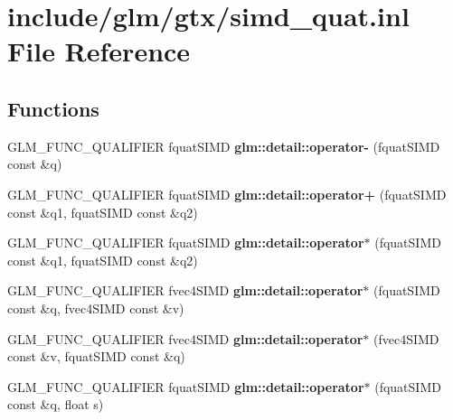 \hypertarget{simd__quat_8inl}{}\section{include/glm/gtx/simd\+\_\+quat.inl File Reference}
\label{simd__quat_8inl}
\subsection*{Functions}
\begin{DoxyCompactItemize}
\item 
\mbox{\label{simd__quat_8inl_a07dbb5e436fcb64a3c165a15c920a484}} 
G\+L\+M\+\_\+\+F\+U\+N\+C\+\_\+\+Q\+U\+A\+L\+I\+F\+I\+ER fquat\+S\+I\+MD {\bfseries glm\+::detail\+::operator-\/} (fquat\+S\+I\+MD const \&q)
\item 
\mbox{\label{simd__quat_8inl_a0010f5683721f2724e0e00709fc51405}} 
G\+L\+M\+\_\+\+F\+U\+N\+C\+\_\+\+Q\+U\+A\+L\+I\+F\+I\+ER fquat\+S\+I\+MD {\bfseries glm\+::detail\+::operator+} (fquat\+S\+I\+MD const \&q1, fquat\+S\+I\+MD const \&q2)
\item 
\mbox{\label{simd__quat_8inl_a6e7c8ca42117ec6c0c60b765f083557b}} 
G\+L\+M\+\_\+\+F\+U\+N\+C\+\_\+\+Q\+U\+A\+L\+I\+F\+I\+ER fquat\+S\+I\+MD {\bfseries glm\+::detail\+::operator$\ast$} (fquat\+S\+I\+MD const \&q1, fquat\+S\+I\+MD const \&q2)
\item 
\mbox{\label{simd__quat_8inl_af198c6bb57f5b38b3fd5961b8d9b352e}} 
G\+L\+M\+\_\+\+F\+U\+N\+C\+\_\+\+Q\+U\+A\+L\+I\+F\+I\+ER fvec4\+S\+I\+MD {\bfseries glm\+::detail\+::operator$\ast$} (fquat\+S\+I\+MD const \&q, fvec4\+S\+I\+MD const \&v)
\item 
\mbox{\label{simd__quat_8inl_a8da00ab5a90294ba3a8c7ebcb20a8bed}} 
G\+L\+M\+\_\+\+F\+U\+N\+C\+\_\+\+Q\+U\+A\+L\+I\+F\+I\+ER fvec4\+S\+I\+MD {\bfseries glm\+::detail\+::operator$\ast$} (fvec4\+S\+I\+MD const \&v, fquat\+S\+I\+MD const \&q)
\item 
\mbox{\label{simd__quat_8inl_a828cc0ad293110da78ec58305e89ac3a}} 
G\+L\+M\+\_\+\+F\+U\+N\+C\+\_\+\+Q\+U\+A\+L\+I\+F\+I\+ER fquat\+S\+I\+MD {\bfseries glm\+::detail\+::operator$\ast$} (fquat\+S\+I\+MD const \&q, float s)

\end{DoxyCompactItemize}
